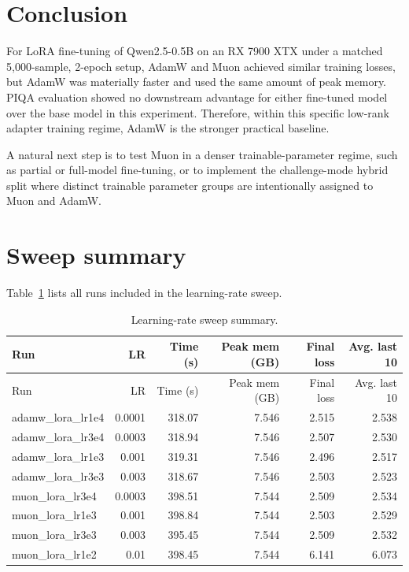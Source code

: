 \documentclass[11pt]{article}
\begin{document}
\section{Conclusion}
For LoRA fine-tuning of Qwen2.5-0.5B on an RX 7900 XTX under a matched 5,000-sample, 2-epoch setup, AdamW and Muon achieved similar training losses, but AdamW was materially faster and used the same amount of peak memory.
PIQA evaluation showed no downstream advantage for either fine-tuned model over the base model in this experiment.
Therefore, within this specific low-rank adapter training regime, AdamW is the stronger practical baseline.

A natural next step is to test Muon in a denser trainable-parameter regime, such as partial or full-model fine-tuning, or to implement the challenge-mode hybrid split where distinct trainable parameter groups are intentionally assigned to Muon and AdamW.

\appendix
\section{Sweep summary}
Table~\ref{tab:sweep} lists all runs included in the learning-rate sweep.

\begin{center}
\small
\begin{longtable}{lrrrrr}
\caption{Learning-rate sweep summary.} \label{tab:sweep}\\
\toprule
Run & LR & Time (s) & Peak mem (GB) & Final loss & Avg. last 10 \\
\midrule
\endfirsthead
\toprule
Run & LR & Time (s) & Peak mem (GB) & Final loss & Avg. last 10 \\
\midrule
\endhead
adamw\_lora\_lr1e4 & 0.0001 & 318.07 & 7.546 & 2.515 & 2.538 \\
adamw\_lora\_lr3e4 & 0.0003 & 318.94 & 7.546 & 2.507 & 2.530 \\
adamw\_lora\_lr1e3 & 0.001 & 319.31 & 7.546 & 2.496 & 2.517 \\
adamw\_lora\_lr3e3 & 0.003 & 318.67 & 7.546 & 2.503 & 2.523 \\
muon\_lora\_lr3e4 & 0.0003 & 398.51 & 7.544 & 2.509 & 2.534 \\
muon\_lora\_lr1e3 & 0.001 & 398.84 & 7.544 & 2.503 & 2.529 \\
muon\_lora\_lr3e3 & 0.003 & 395.45 & 7.544 & 2.509 & 2.532 \\
muon\_lora\_lr1e2 & 0.01 & 398.45 & 7.544 & 6.141 & 6.073 \\

\bottomrule
\end{longtable}
\end{center}
\end{document}
